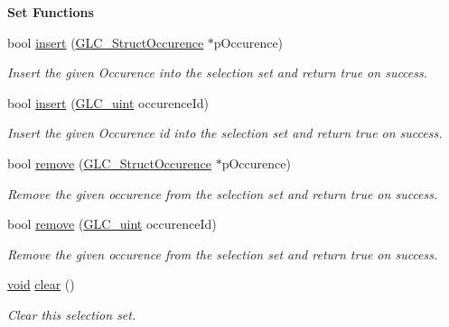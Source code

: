 \begin{Indent}{\bf Set Functions}\par
\begin{DoxyCompactItemize}
\item 
bool \hyperlink{class_g_l_c___selection_set_a672ee5da50288d62adbae732ee889928}{insert} (\hyperlink{class_g_l_c___struct_occurence}{G\-L\-C\-\_\-\-Struct\-Occurence} $\ast$p\-Occurence)
\begin{DoxyCompactList}\small\item\em Insert the given Occurence into the selection set and return true on success. \end{DoxyCompactList}\item 
bool \hyperlink{class_g_l_c___selection_set_a7045726f6c776645f4c55b770ee2f9fc}{insert} (\hyperlink{glc__global_8h_abf950976fabed69026558df8e2da6c6b}{G\-L\-C\-\_\-uint} occurence\-Id)
\begin{DoxyCompactList}\small\item\em Insert the given Occurence id into the selection set and return true on success. \end{DoxyCompactList}\item 
bool \hyperlink{class_g_l_c___selection_set_aa426d834e69ff0f55f3a2ae15fbeffc6}{remove} (\hyperlink{class_g_l_c___struct_occurence}{G\-L\-C\-\_\-\-Struct\-Occurence} $\ast$p\-Occurence)
\begin{DoxyCompactList}\small\item\em Remove the given occurence from the selection set and return true on success. \end{DoxyCompactList}\item 
bool \hyperlink{class_g_l_c___selection_set_a163d7f6365d77dd2d659a70185e45fd5}{remove} (\hyperlink{glc__global_8h_abf950976fabed69026558df8e2da6c6b}{G\-L\-C\-\_\-uint} occurence\-Id)
\begin{DoxyCompactList}\small\item\em Remove the given occurence from the selection set and return true on success. \end{DoxyCompactList}\item 
\hyperlink{group___u_a_v_objects_plugin_ga444cf2ff3f0ecbe028adce838d373f5c}{void} \hyperlink{class_g_l_c___selection_set_a92f9526c0d2f2f7d63e70be5da2c33a3}{clear} ()
\begin{DoxyCompactList}\small\item\em Clear this selection set. \end{DoxyCompactList}\item 

\end{DoxyCompactItemize}
\end{Indent}
